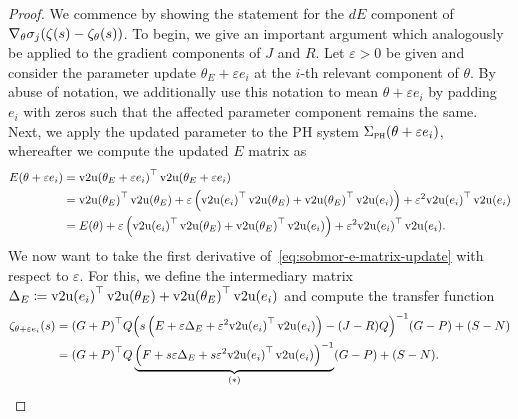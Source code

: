 \begin{proof}
    We commence by showing the statement for the $dE$ component of $\nabla_\theta \sigma_j(\zeta(s) - \zeta_\theta(s))$.
    To begin, we give an important argument which analogously be applied to the gradient components of $J$ and $R$.
    Let $\varepsilon > 0$ be given and consider the parameter update $\theta_E + \varepsilon e_i$ at the $i$-th relevant component of $\theta$.
    By abuse of notation, we additionally use this notation to mean $\theta + \varepsilon e_i$ by padding $e_i$ with zeros such that the affected parameter component remains the same.
    Next, we apply the updated parameter to the \ac{PH} system $\Sigma_{\textnormal{\scshape ph}}(\theta + \varepsilon e_i)$, whereafter we compute the updated $E$ matrix as
    \begin{equation}\label{eq:sobmor-e-matrix-update}
        \begin{aligned}
            E(\theta + \varepsilon e_i) &= {\vecupper(\theta_E + \varepsilon e_i)}\trans \vecupper(\theta_E + \varepsilon e_i) \\
             &= {\vecupper(\theta_E)}\trans \vecupper(\theta_E) + \varepsilon \left( {\vecupper(e_i)}\trans \vecupper(\theta_E) + {\vecupper(\theta_E)}\trans \vecupper(e_i) \right) + \varepsilon^2 {\vecupper(e_i)}\trans \vecupper(e_i) \\
             &= E(\theta) + \varepsilon \left( {\vecupper(e_i)}\trans \vecupper(\theta_E) + {\vecupper(\theta_E)}\trans \vecupper(e_i) \right) + \varepsilon^2 {\vecupper(e_i)}\trans \vecupper(e_i).
        \end{aligned}
    \end{equation}
    We now want to take the first derivative of~\eqref{eq:sobmor-e-matrix-update} with respect to $\varepsilon$.
    For this, we define the intermediary matrix $\Delta_E \coloneqq {\mathop{}\!\mathrm{v}2\mathrm{u}(e_i)}^{\top} \mathop{}\!\mathrm{v}2\mathrm{u}(\theta_E) + {\mathop{}\!\mathrm{v}2\mathrm{u}(\theta_E)}^{\top} \mathop{}\!\mathrm{v}2\mathrm{u}(e_i)$ and compute the transfer function
    \begin{equation}\label{eq:sobmor-e-variation}
        \begin{aligned}
            \tfunc_{\theta + \varepsilon e_i}(s) &= {(G + P)}\trans Q {\left( s \left( E + \varepsilon \Delta_E + \varepsilon^2 {\vecupper(e_i)}\trans \vecupper(e_i) \right) - (J - R) Q \right)}\inv (G - P) + (S - N) \\
             &= {(G + P)}\trans Q \underbrace{{\left( F + s \varepsilon \Delta_E + s \varepsilon^2 {\vecupper(e_i)}\trans \vecupper(e_i) \right)}\inv}_{(*)} (G - P) + (S - N).
        \end{aligned}

\end{equation}
\end{proof}
